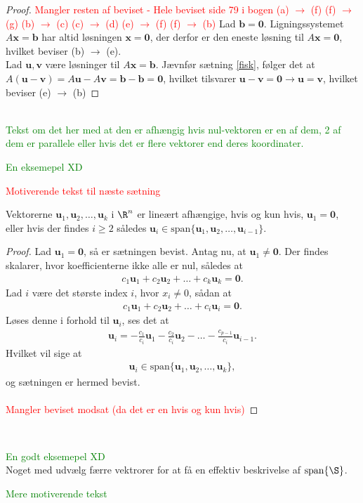 \begin{proof}
%
\textcolor{red}{Mangler resten af beviset - Hele beviset side 79 i bogen
%
(a) $\rightarrow$ (f)
(f) $\rightarrow$ (g)
(b) $\rightarrow$ (c)
(c) $\rightarrow$ (d)
(e) $\rightarrow$ (f)
(f) $\rightarrow$ (b)
%
}
Lad $\mathbf{b}=\mathbf{0}$. 
Ligningssystemet $A\mathbf{x}=\mathbf{b}$ har altid løsningen $\mathbf{x}=\mathbf{0}$, der derfor er den eneste løsning til $A\mathbf{x}=\mathbf{0}$, hvilket beviser (b) $\rightarrow$ (e).
\\
Lad $\mathbf{u}, \mathbf{v}$ være løsninger til $A\mathbf{x}=\mathbf{b}$.
Jævnfør sætning \ref{fisk}, følger det at $A(\mathbf{u}-\mathbf{v})=A\mathbf{u}-A\mathbf{v}=\mathbf{b}-\mathbf{b}=\mathbf{0}$, hvilket tilsvarer $\mathbf{u}-\mathbf{v}=\mathbf{0}
\rightarrow  
\mathbf{u} =\mathbf{v}$, hvilket beviser (e) $\rightarrow$ (b)
%
%
\end{proof}
\\
%
\textcolor{green}{Tekst om det her med at den er afhængig hvis nul-vektoren er en af dem, 2 af dem er parallele eller hvis det er flere vektorer end deres koordinater.}
\\
%
\begin{eks}
\textcolor{green}{En eksemepel XD}
\end{eks}
%
\textcolor{red}{Motiverende tekst til næste sætning}
%
\begin{thm}{}{}
%
Vektorerne $\mathbf{u}_1,\mathbf{u}_2, \ldots ,\mathbf{u}_k$ i $\R^n$ er lineært afhængige, 
hvis og kun hvis, $\mathbf{u}_1=\mathbf{0}$, eller hvis der findes $i \geq 2$ således $\mathbf{u}_i \in \text{span} \{ \mathbf{u}_1,\mathbf{u}_2, \ldots ,\mathbf{u}_{i-1} \}$.
%
\end{thm}
%
\begin{proof}
%
Lad $\mathbf{u}_1=\mathbf{0}$, så er sætningen bevist. 
Antag nu, at $\mathbf{u}_1 \neq \mathbf{0}$. 
Der findes skalarer, hvor koefficienterne ikke alle er nul, således at
% 
\begin{align*}
c_1 \mathbf{u}_1 + c_2 \mathbf{u}_2 + \ldots + c_k \mathbf{u}_k = \mathbf{0}.
\end{align*}
%
Lad $i$ være det største index $i$, hvor $x_i \neq 0$, sådan at 
\begin{align*}
c_1 \mathbf{u}_1 + c_2 \mathbf{u}_2 + \ldots + c_i \mathbf{u}_i = \mathbf{0}.
\end{align*}
Løses denne i forhold til $\mathbf{u}_i$, ses det at
\begin{align*}
\mathbf{u}_i = - \frac{c_1}{c_i} \mathbf{u}_1 - \frac{c_2}{c_i} \mathbf{u}_2 - \ldots - \frac{c_{p-1}}{c_i} \mathbf{u}_{i-1}.
\end{align*}
Hvilket vil sige at 
\begin{align*}
\mathbf{u}_i \in \text{span}\{ \mathbf{u}_1,\mathbf{u}_2, \ldots ,\mathbf{u}_k \},
\end{align*}
%
og sætningen er hermed bevist.
%
\\\\
\textcolor{red}{Mangler beviset modsat (da det er en hvis og kun hvis)}
%
\end{proof}
\\
%
%
\begin{eks}
\textcolor{green}{En godt eksemepel XD} 
\\
Noget med udvælg færre vektrorer for at få en effektiv beskrivelse af $\text{span}\{\S\}$.
\end{eks}
%
\textcolor{green}{Mere motiverende tekst}